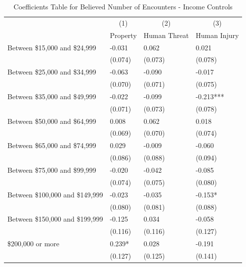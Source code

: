 \documentclass[english,12pt]{article}
\begin{document}
\begin{table}[H]
    \centering
    \caption{Coefficients Table for Believed Number of Encounters - Income Controls}
    \footnotesize
    \begin{tabular}{@{}llll@{}}
        \toprule
                           &\multicolumn{1}{c}{(1)}   &\multicolumn{1}{c}{(2)}   &\multicolumn{1}{c}{(3)}  \\
                           & Property & Human Threat & Human Injury \\ \midrule
        Between \$15,000 and \$24,999&      -0.031   &       0.062   &       0.021   \\
                    &     (0.074)   &     (0.073)   &     (0.078)   \\
        Between \$25,000 and \$34,999&      -0.063   &      -0.090   &      -0.017   \\
                    &     (0.070)   &     (0.071)   &     (0.075)   \\
        Between \$35,000 and \$49,999&      -0.022   &      -0.099   &      -0.213***\\
                    &     (0.071)   &     (0.073)   &     (0.078)   \\
        Between \$50,000 and \$64,999&       0.008   &       0.062   &       0.018   \\
                    &     (0.069)   &     (0.070)   &     (0.074)   \\
        Between \$65,000 and \$74,999&       0.029   &      -0.009   &      -0.060   \\
                    &     (0.086)   &     (0.088)   &     (0.094)   \\
        Between \$75,000 and \$99,999&      -0.020   &      -0.042   &      -0.085   \\
                    &     (0.074)   &     (0.075)   &     (0.080)   \\
        Between \$100,000 and \$149,999&      -0.023   &      -0.035   &      -0.153*  \\
                    &     (0.080)   &     (0.081)   &     (0.088)   \\
        Between \$150,000 and \$199,999&      -0.125   &       0.034   &      -0.058   \\
                    &     (0.116)   &     (0.116)   &     (0.127)   \\
        \$200,000 or more&       0.239*  &       0.028   &      -0.191   \\
                    &     (0.127)   &     (0.125)   &     (0.141)   \\\midrule                       

\end{tabular}
\end{table}
\end{document}
